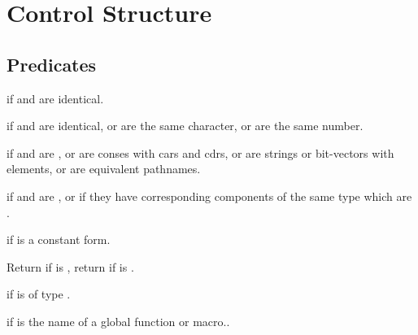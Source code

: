 %
%

\section{Control Structure}

\subsection{Predicates}
\begin{LIST}{1cm}

  \retval{\T} if  and  are identical.

  \retval{\T} if  and 
  are identical, or are the same character, or are the same number.

  \retval{\T} if  and 
  are , or are conses with  cars and cdrs, or are
  strings or bit-vectors with   elements, or are equivalent pathnames.

  \retval{\T} if  and 
  are , or if they have corresponding components of the same
  type which are .

  \retval{\T} if  is a constant form.

  Return \retval{\NIL} if  is \T, return \retval{\T} if  is \NIL.

  \retval{\T} if  is of type .

  \retval{\T} if  is the name of a global function or macro..


\end{LIST}


